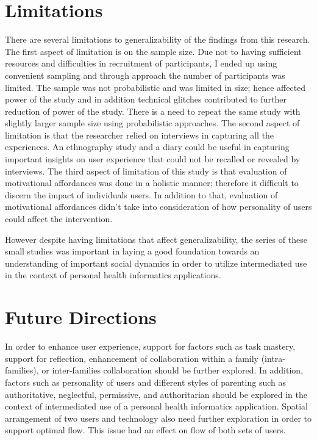 \section{Limitations}
There are several limitations to generalizability of the findings from this research. The first aspect of limitation is on the sample size. Due not to having sufficient resources and difficulties in recruitment of participants, I ended up using convenient sampling and through approach the number of participants was limited. The sample was not probabilistic and was limited in size; hence affected power of the study and in addition technical glitches contributed to further reduction of power of the study. There is a need to repeat the same study with slightly larger sample size using probabilistic approaches.   The second aspect of limitation is that the researcher relied on interviews in capturing all the experiences. An ethnography study and a diary could be useful in capturing important insights on user experience that could not be recalled or revealed by interviews. The third aspect of limitation of this study is that evaluation of motivational affordances was done in a holistic manner; therefore it difficult to discern the impact of individuals users. In addition to that, evaluation of motivational affordances didn't take into consideration of how personality of users could affect the intervention.  

However despite having limitations that affect generalizability, the series of these small studies was important in laying a good foundation towards an understanding of important social dynamics in order to utilize intermediated use in the context of personal health informatics applications. 

\section{Future Directions}
In order to enhance user experience, support for factors such as task mastery, support for reflection, enhancement of collaboration within a family (intra-families), or inter-families collaboration should be further explored. In addition, factors such as personality of users and different styles of parenting such as authoritative, neglectful, permissive, and authoritarian should be explored in the context of intermediated use of a personal health informatics application. Spatial arrangement of two users and technology also need further exploration in order to support optimal flow. This issue had an effect on flow of both sets of users. 

